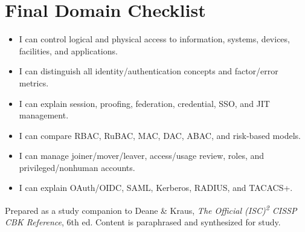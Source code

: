 \documentclass[10pt,letterpaper]{article}
\begin{document}
\section{Final Domain Checklist}
\begin{itemize}[label=\(\square\)]
\item I can control logical and physical access to information, systems, devices, facilities, and applications.
\item I can distinguish all identity/authentication concepts and factor/error metrics.
\item I can explain session, proofing, federation, credential, SSO, and JIT management.
\item I can compare RBAC, RuBAC, MAC, DAC, ABAC, and risk-based models.
\item I can manage joiner/mover/leaver, access/usage review, roles, and privileged/nonhuman accounts.
\item I can explain OAuth/OIDC, SAML, Kerberos, RADIUS, and TACACS+.
\end{itemize}
\vfill{\footnotesize\color{Teal}Prepared as a study companion to Deane \& Kraus, \textit{The Official (ISC)\textsuperscript{2} CISSP CBK Reference}, 6th ed. Content is paraphrased and synthesized for study.}
\end{document}
